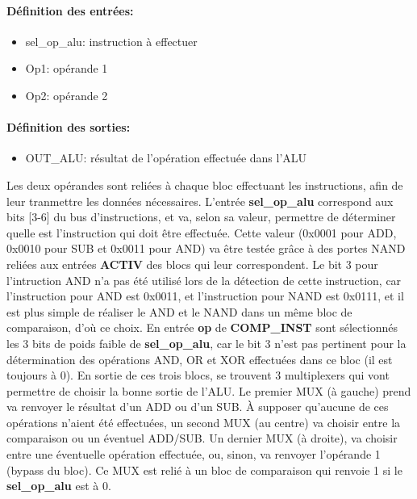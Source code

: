\documentclass[a4paper]{article} %
\begin{document}
\paragraph{Définition des entrées:}
\begin{itemize}
    \item     sel\_op\_alu: instruction à effectuer
    \item     Op1: opérande 1
    \item     Op2: opérande 2
\end{itemize}

\paragraph{Définition des sorties:}
\begin{itemize}
    \item     OUT\_ALU: résultat de l'opération effectuée dans l'ALU
\end{itemize}
\medskip
Les deux opérandes sont reliées à chaque bloc effectuant les instructions, afin de leur tranmettre les données nécessaires. L'entrée \textbf{sel\_op\_alu} correspond aux bits [3-6] du bus d'instructions, et va, selon sa valeur, permettre de déterminer quelle est l'instruction qui doit être effectuée. Cette valeur (0x0001 pour ADD, 0x0010 pour SUB et 0x0011 pour AND) va être testée grâce à des portes NAND reliées aux entrées \textbf{ACTIV} des blocs qui leur correspondent. Le bit 3 pour l'intruction AND n'a pas été utilisé lors de la détection de cette instruction, car l'instruction pour AND est 0x0011, et l'instruction pour NAND est 0x0111, et il est plus simple de réaliser le AND et le NAND dans un même bloc de comparaison, d'où ce choix.
En entrée \textbf{op} de \textbf{COMP\_INST} sont sélectionnés les 3 bits de poids faible de \textbf{sel\_op\_alu}, car le bit 3 n'est pas pertinent pour la détermination des opérations AND, OR et XOR effectuées dans ce bloc (il est toujours à 0).
En sortie de ces trois blocs, se trouvent 3 multiplexers qui vont permettre de choisir la bonne sortie de l'ALU. Le premier MUX (à gauche) prend va renvoyer le résultat d'un ADD ou d'un SUB. À supposer qu'aucune de ces opérations n'aient été effectuées, un second MUX (au centre) va choisir entre la comparaison ou un éventuel ADD/SUB. Un dernier MUX (à droite), va choisir entre une éventuelle opération effectuée, ou, sinon, va renvoyer l'opérande 1 (bypass du bloc). Ce MUX est relié à un bloc de comparaison qui renvoie 1 si le \textbf{sel\_op\_alu} est à 0.
\end{document}
